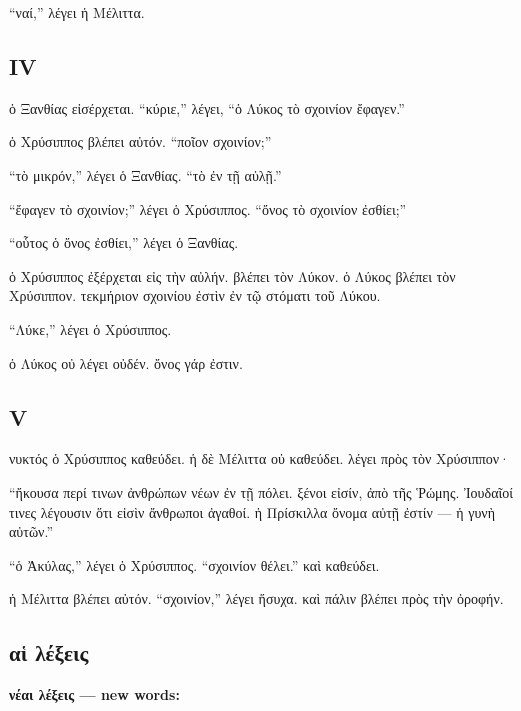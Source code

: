 \documentclass[a4paper]{report}
\begin{document}
``ναί,'' λέγει ἡ Μέλιττα.

\subsection{IV}\label{iv-1}

ὁ Ξανθίας εἰσέρχεται. ``κύριε,'' λέγει, ``ὁ Λύκος τὸ σχοινίον ἔφαγεν.''

ὁ Χρύσιππος βλέπει αὐτόν. ``ποῖον σχοινίον;''

``τὸ μικρόν,'' λέγει ὁ Ξανθίας. ``τὸ ἐν τῇ αὐλῇ.''

``ἔφαγεν τὸ σχοινίον;'' λέγει ὁ Χρύσιππος. ``ὄνος τὸ σχοινίον ἐσθίει;''

``οὗτος ὁ ὄνος ἐσθίει,'' λέγει ὁ Ξανθίας.

ὁ Χρύσιππος ἐξέρχεται εἰς τὴν αὐλήν. βλέπει τὸν Λύκον. ὁ Λύκος βλέπει
τὸν Χρύσιππον. τεκμήριον σχοινίου ἐστὶν ἐν τῷ στόματι τοῦ Λύκου.

``Λύκε,'' λέγει ὁ Χρύσιππος.

ὁ Λύκος οὐ λέγει οὐδέν. ὄνος γάρ ἐστιν.

\subsection{V}\label{v-2}

νυκτός ὁ Χρύσιππος καθεύδει. ἡ δὲ Μέλιττα οὐ καθεύδει. λέγει πρὸς τὸν
Χρύσιππον·

``ἤκουσα περί τινων ἀνθρώπων νέων ἐν τῇ πόλει. ξένοι εἰσίν, ἀπὸ τῆς
Ῥώμης. Ἰουδαῖοί τινες λέγουσιν ὅτι εἰσὶν ἄνθρωποι ἀγαθοί. ἡ Πρίσκιλλα
ὄνομα αὐτῇ ἐστίν --- ἡ γυνὴ αὐτῶν.''

``ὁ Ἀκύλας,'' λέγει ὁ Χρύσιππος. ``σχοινίον θέλει.'' καὶ καθεύδει.

ἡ Μέλιττα βλέπει αὐτόν. ``σχοινίον,'' λέγει ἥσυχα. καὶ πάλιν βλέπει πρὸς
τὴν ὀροφήν.

\subsection{αἱ
λέξεις}\label{ux3b1ux1f31-ux3bbux3adux3beux3b5ux3b9ux3c2-1}

\textbf{νέαι λέξεις --- new words:}
\end{document}
